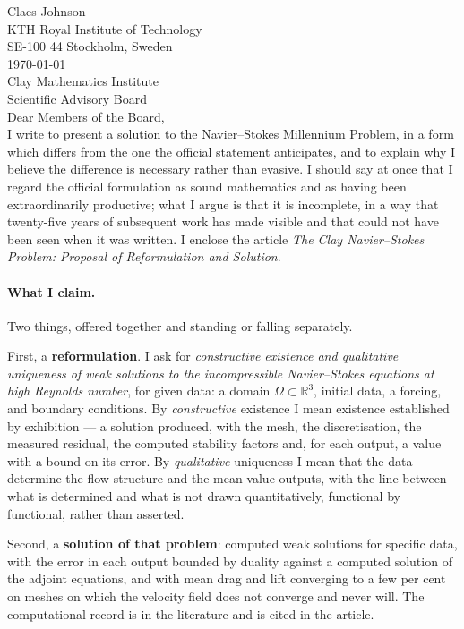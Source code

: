 \documentclass[11pt]{article}
\begin{document}
\noindent
Claes Johnson\\
KTH Royal Institute of Technology\\
SE-100 44 Stockholm, Sweden\\[1.2em]
\today\\[1.6em]
%
\noindent
Clay Mathematics Institute\\
Scientific Advisory Board\\[1.8em]

\noindent Dear Members of the Board,\\[0.8em]

I write to present a solution to the Navier--Stokes Millennium Problem, in a form which differs from
the one the official statement anticipates, and to explain why I believe the difference is necessary
rather than evasive. I should say at once that I regard the official formulation as sound
mathematics and as having been extraordinarily productive; what I argue is that it is incomplete, in
a way that twenty-five years of subsequent work has made visible and that could not have been seen
when it was written. I enclose the article \emph{The Clay Navier--Stokes Problem: Proposal of
Reformulation and Solution}.

\paragraph{What I claim.} Two things, offered together and standing or falling separately.

First, a \textbf{reformulation}. I ask for \emph{constructive existence and qualitative uniqueness of
weak solutions to the incompressible Navier--Stokes equations at high Reynolds number}, for given data:
a domain $\Omega\subset\mathbb{R}^3$, initial data, a forcing, and boundary conditions. By
\emph{constructive} existence I mean existence established by exhibition --- a solution produced, with
the mesh, the discretisation, the measured residual, the computed stability factors and, for each
output, a value with a bound on its error. By \emph{qualitative} uniqueness I mean that the data
determine the flow structure and the mean-value outputs, with the line between what is determined and
what is not drawn quantitatively, functional by functional, rather than asserted.

Second, a \textbf{solution of that problem}: computed weak solutions for specific data, with the error
in each output bounded by duality against a computed solution of the adjoint equations, and with mean
drag and lift converging to a few per cent on meshes on which the velocity field does not converge and
never will. The computational record is in the literature and is cited in the article.
\end{document}
